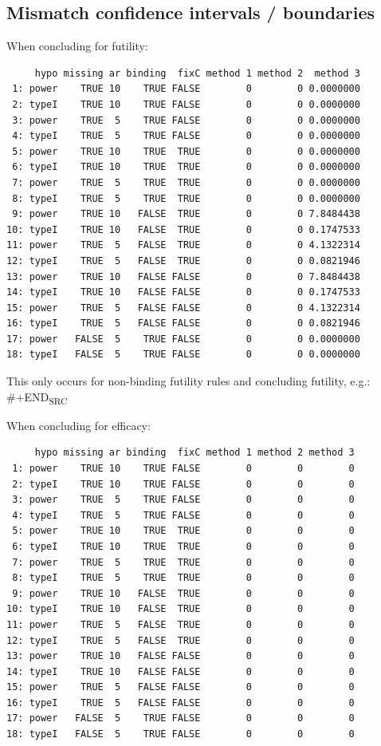 \documentclass[12pt]{article}
\begin{document}
\clearpage

\subsection{Mismatch confidence intervals / boundaries}
\label{sec:org5b21698}

When concluding for futility:
\begin{verbatim}
     hypo missing ar binding  fixC method 1 method 2  method 3
 1: power    TRUE 10    TRUE FALSE        0        0 0.0000000
 2: typeI    TRUE 10    TRUE FALSE        0        0 0.0000000
 3: power    TRUE  5    TRUE FALSE        0        0 0.0000000
 4: typeI    TRUE  5    TRUE FALSE        0        0 0.0000000
 5: power    TRUE 10    TRUE  TRUE        0        0 0.0000000
 6: typeI    TRUE 10    TRUE  TRUE        0        0 0.0000000
 7: power    TRUE  5    TRUE  TRUE        0        0 0.0000000
 8: typeI    TRUE  5    TRUE  TRUE        0        0 0.0000000
 9: power    TRUE 10   FALSE  TRUE        0        0 7.8484438
10: typeI    TRUE 10   FALSE  TRUE        0        0 0.1747533
11: power    TRUE  5   FALSE  TRUE        0        0 4.1322314
12: typeI    TRUE  5   FALSE  TRUE        0        0 0.0821946
13: power    TRUE 10   FALSE FALSE        0        0 7.8484438
14: typeI    TRUE 10   FALSE FALSE        0        0 0.1747533
15: power    TRUE  5   FALSE FALSE        0        0 4.1322314
16: typeI    TRUE  5   FALSE FALSE        0        0 0.0821946
17: power   FALSE  5    TRUE FALSE        0        0 0.0000000
18: typeI   FALSE  5    TRUE FALSE        0        0 0.0000000
\end{verbatim}

This only occurs for non-binding futility rules and concluding futility, e.g.:
\#+END\textsubscript{SRC}


When concluding for efficacy:
\begin{verbatim}
     hypo missing ar binding  fixC method 1 method 2 method 3
 1: power    TRUE 10    TRUE FALSE        0        0        0
 2: typeI    TRUE 10    TRUE FALSE        0        0        0
 3: power    TRUE  5    TRUE FALSE        0        0        0
 4: typeI    TRUE  5    TRUE FALSE        0        0        0
 5: power    TRUE 10    TRUE  TRUE        0        0        0
 6: typeI    TRUE 10    TRUE  TRUE        0        0        0
 7: power    TRUE  5    TRUE  TRUE        0        0        0
 8: typeI    TRUE  5    TRUE  TRUE        0        0        0
 9: power    TRUE 10   FALSE  TRUE        0        0        0
10: typeI    TRUE 10   FALSE  TRUE        0        0        0
11: power    TRUE  5   FALSE  TRUE        0        0        0
12: typeI    TRUE  5   FALSE  TRUE        0        0        0
13: power    TRUE 10   FALSE FALSE        0        0        0
14: typeI    TRUE 10   FALSE FALSE        0        0        0
15: power    TRUE  5   FALSE FALSE        0        0        0
16: typeI    TRUE  5   FALSE FALSE        0        0        0
17: power   FALSE  5    TRUE FALSE        0        0        0
18: typeI   FALSE  5    TRUE FALSE        0        0        0
\end{verbatim}
\end{document}
